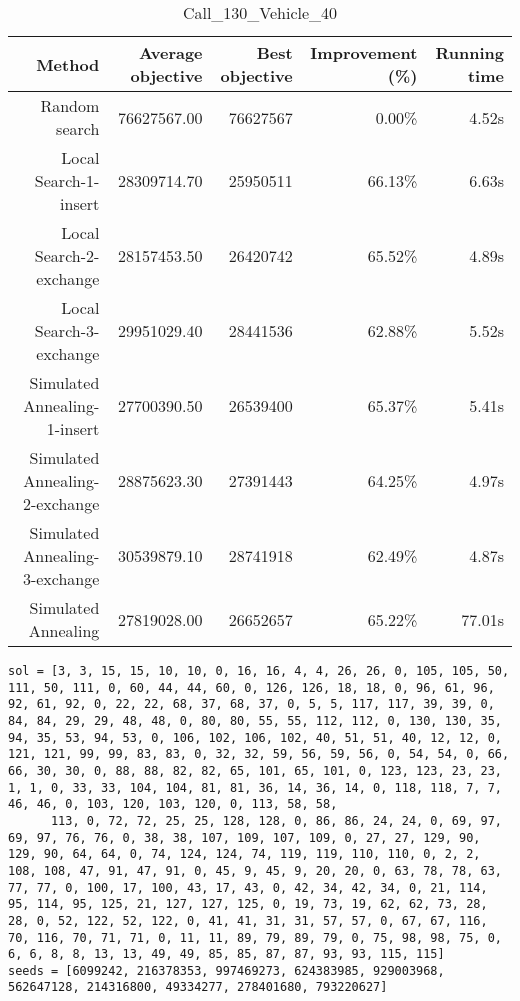 \begin{table}[ht]
\centering
\caption{Call\_130\_Vehicle\_40}
\label{tab:call130vehicle40}
\begin{tabular}{|r|r|r|r|r|}
Method & Average objective & Best objective & Improvement (\%) & Running time \\
\hline
Random search & 76627567.00 & 76627567 & 0.00\% & 4.52s\\
Local Search-1-insert & 28309714.70 & 25950511 & 66.13\% & 6.63s\\
Local Search-2-exchange & 28157453.50 & 26420742 & 65.52\% & 4.89s\\
Local Search-3-exchange & 29951029.40 & 28441536 & 62.88\% & 5.52s\\
Simulated Annealing-1-insert & 27700390.50 & 26539400 & 65.37\% & 5.41s\\
Simulated Annealing-2-exchange & 28875623.30 & 27391443 & 64.25\% & 4.97s\\
Simulated Annealing-3-exchange & 30539879.10 & 28741918 & 62.49\% & 4.87s\\
Simulated Annealing & 27819028.00 & 26652657 & 65.22\% & 77.01s\\
\end{tabular}%
\end{table}
\begin{lstlisting}[label={lst:call130vehicle40},caption=Optimal solution call\_130\_vehicle\_40]
sol = [3, 3, 15, 15, 10, 10, 0, 16, 16, 4, 4, 26, 26, 0, 105, 105, 50, 111, 50, 111, 0, 60, 44, 44, 60, 0, 126, 126, 18, 18, 0, 96, 61, 96, 92, 61, 92, 0, 22, 22, 68, 37, 68, 37, 0, 5, 5, 117, 117, 39, 39, 0, 84, 84, 29, 29, 48, 48, 0, 80, 80, 55, 55, 112, 112, 0, 130, 130, 35, 94, 35, 53, 94, 53, 0, 106, 102, 106, 102, 40, 51, 51, 40, 12, 12, 0, 121, 121, 99, 99, 83, 83, 0, 32, 32, 59, 56, 59, 56, 0, 54, 54, 0, 66, 66, 30, 30, 0, 88, 88, 82, 82, 65, 101, 65, 101, 0, 123, 123, 23, 23, 1, 1, 0, 33, 33, 104, 104, 81, 81, 36, 14, 36, 14, 0, 118, 118, 7, 7, 46, 46, 0, 103, 120, 103, 120, 0, 113, 58, 58,
      113, 0, 72, 72, 25, 25, 128, 128, 0, 86, 86, 24, 24, 0, 69, 97, 69, 97, 76, 76, 0, 38, 38, 107, 109, 107, 109, 0, 27, 27, 129, 90, 129, 90, 64, 64, 0, 74, 124, 124, 74, 119, 119, 110, 110, 0, 2, 2, 108, 108, 47, 91, 47, 91, 0, 45, 9, 45, 9, 20, 20, 0, 63, 78, 78, 63, 77, 77, 0, 100, 17, 100, 43, 17, 43, 0, 42, 34, 42, 34, 0, 21, 114, 95, 114, 95, 125, 21, 127, 127, 125, 0, 19, 73, 19, 62, 62, 73, 28, 28, 0, 52, 122, 52, 122, 0, 41, 41, 31, 31, 57, 57, 0, 67, 67, 116, 70, 116, 70, 71, 71, 0, 11, 11, 89, 79, 89, 79, 0, 75, 98, 98, 75, 0, 6, 6, 8, 8, 13, 13, 49, 49, 85, 85, 87, 87, 93, 93, 115, 115]
seeds = [6099242, 216378353, 997469273, 624383985, 929003968, 562647128, 214316800, 49334277, 278401680, 793220627]
\end{lstlisting}%
\clearpage


